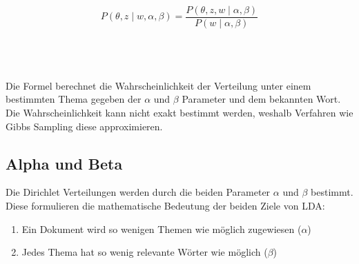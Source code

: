 \documentclass[german,version-2020-11]{uzl-thesis}
\begin{document}
\begin{center}
\begin{equation}
P(\theta, z \mid w, \alpha, \beta) = \frac{P(\theta, z, w \mid \alpha, \beta)}{P(w \mid \alpha, \beta)}
\end{equation}
\end{center}\\
\\
\\
Die Formel berechnet die Wahrscheinlichkeit der Verteilung unter einem bestimmten Thema gegeben der $\alpha$ und $\beta$ Parameter und dem bekannten Wort. Die Wahrscheinlichkeit kann nicht exakt bestimmt werden, weshalb Verfahren wie Gibbs Sampling diese approximieren.\\

\subsection{Alpha und Beta}
Die Dirichlet Verteilungen werden durch die beiden Parameter $\alpha$ und $\beta$ bestimmt. Diese formulieren die mathematische Bedeutung der beiden Ziele von LDA:

\begin{enumerate}
	\item Ein Dokument wird so wenigen Themen wie möglich zugewiesen ($\alpha$)
	\item Jedes Thema hat so wenig relevante Wörter wie möglich ($\beta$)
\end{enumerate}
\end{document}
